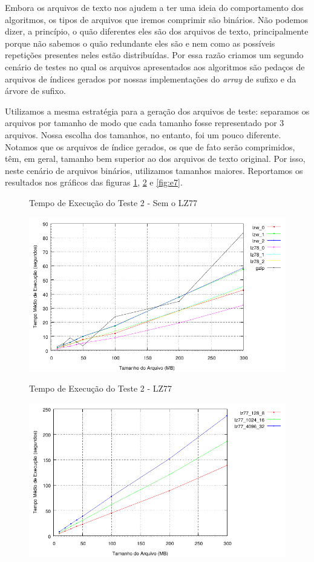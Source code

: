 \documentclass[]{article}
\begin{document}
Embora os arquivos de texto nos ajudem a ter uma ideia do comportamento dos algoritmos, os tipos de arquivos que iremos comprimir são binários. Não podemos dizer, a princípio, o quão diferentes eles são dos arquivos de texto, principalmente porque não sabemos o quão redundante eles são e nem como as possíveis repetições presentes neles estão distribuídas. Por essa razão criamos um segundo cenário de testes no qual os arquivos apresentados aos algoritmos são pedaços de arquivos de índices gerados por nossas implementações do \textit{array} de sufixo e da árvore de sufixo. 

Utilizamos a mesma estratégia para a geração dos arquivos de teste: separamos os arquivos por tamanho de modo que cada tamanho fosse representado por 3 arquivos. Nossa escolha dos tamanhos, no entanto, foi um pouco diferente. Notamos que os arquivos de índice gerados, os que de fato serão comprimidos, têm, em geral, tamanho bem superior ao dos arquivos de texto original. Por isso, neste cenário de arquivos binários, utilizamos tamanhos maiores. Reportamos os resultados nos gráficos das figuras \ref{fig:e5}, \ref{fig:e6} e \ref{fig:e7}.

\begin{figure}
	{\centering Tempo de Execução do Teste 2 - Sem o LZ77\par}
	\includegraphics{images/binario_tempo_sem_lz77}
\caption{}
\label{fig:e5}
\end{figure}

\begin{figure}
	{\centering Tempo de Execução do Teste 2 - LZ77\par}
	\includegraphics{images/binario_tempo_com_lz77}
\caption{}
\label{fig:e6}
\end{figure}
\end{document}

